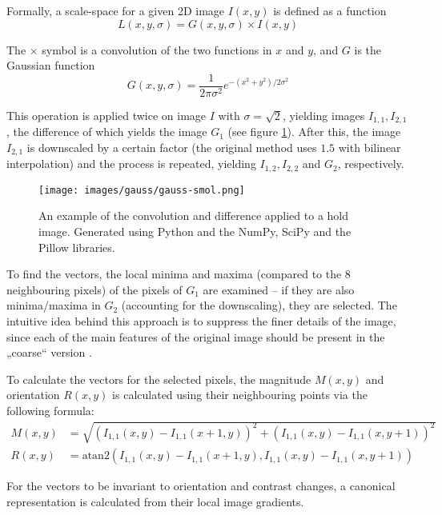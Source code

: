 Formally, a scale-space for a given 2D image $I(x, y)$ is defined as a function
\begin{equation} L(x, y, \sigma) = G(x, y, \sigma) \times I(x, y) \end{equation}

The $\times$ symbol is a convolution of the two functions in $x$ and $y$, and $G$ is the Gaussian function
\begin{equation}G(x, y, \sigma) = \frac{1}{2\pi \sigma^2} e^{-(x^2 + y^2) / 2\sigma^2}\end{equation}

This operation is applied twice on image $I$ with $\sigma = \sqrt{2}$, yielding images $I_{1,1}, I_{2,1}$, the difference of which yields the image $G_1$ (see figure \ref{fig:gaussexample}).
After this, the image $I_{2,1}$ is downscaled by a certain factor (the original method uses $1.5$ with bilinear interpolation) and the process is repeated, yielding $I_{1,2}, I_{2,2}$ and $G_2$, respectively.

\begin{figure}
	\centering
	\texttt{[image: images/gauss/gauss-smol.png]}
	\caption{An example of the convolution and difference applied to a hold image. Generated using Python and the NumPy, SciPy and the Pillow libraries.}
	\label{fig:gaussexample}
\end{figure}

To find the vectors, the local minima and maxima (compared to the 8 neighbouring pixels) of the pixels of $G_1$ are examined -- if they are also minima/maxima in $G_2$ (accounting for the downscaling), they are selected.
The intuitive idea behind this approach is to suppress the finer details of the image, since each of the main features of the original image should be present in the „coarse“ version \cite{scalespace}.

To calculate the vectors for the selected pixels, the magnitude $M(x,y)$ and orientation $R(x,y)$ is calculated using their neighbouring points via the following formula:
\begin{align}
	M(x,y) &= \sqrt{\left(I_{1,1}(x, y) - I_{1,1}(x + 1, y)\right)^2 + \left(I_{1,1}(x,y) - I_{1,1}(x, y + 1)\right)^2} \\[0.7em]
	R(x,y) &= \mathrm{atan2} \left(I_{1,1}(x, y) - I_{1,1}(x + 1, y), I_{1,1}(x,y) - I_{1,1}(x, y + 1)\right)
\end{align}

For the vectors to be invariant to orientation and contrast changes, a canonical representation is calculated from their local image gradients.

